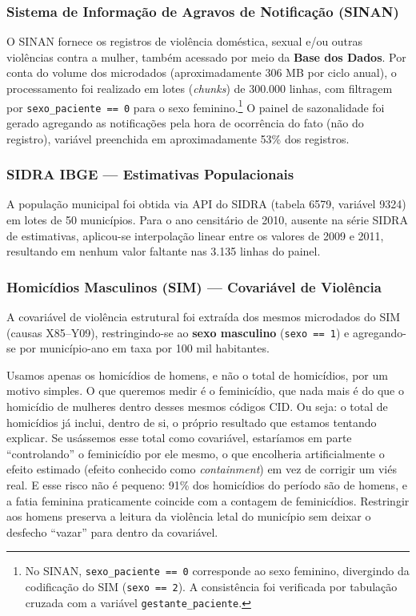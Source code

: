 \documentclass[twocolumn, 10pt]{article}
\begin{document}
\subsubsection{Sistema de Informação de Agravos de Notificação (SINAN)}
O SINAN fornece os registros de violência doméstica, sexual e/ou outras
violências contra a mulher, também acessado por meio da \textbf{Base dos Dados}.
Por conta do volume dos microdados (aproximadamente 306 MB por ciclo anual), o
processamento foi realizado em lotes (\textit{chunks}) de 300.000 linhas, com
filtragem por \texttt{sexo\_paciente == 0} para o sexo feminino.\footnote{No
SINAN, \texttt{sexo\_paciente == 0} corresponde ao sexo feminino, divergindo da
codificação do SIM (\texttt{sexo == 2}). A consistência foi verificada por
tabulação cruzada com a variável \texttt{gestante\_paciente}.}
O painel de sazonalidade foi gerado agregando as
notificações pela hora de ocorrência do fato (não do registro), variável
preenchida em aproximadamente 53\% dos registros.

\subsubsection{SIDRA IBGE — Estimativas Populacionais}
A população municipal foi obtida via API do SIDRA (tabela 6579, variável 9324)
em lotes de 50 municípios. Para o ano censitário de 2010, ausente na série SIDRA
de estimativas, aplicou-se interpolação linear entre os valores de 2009 e 2011,
resultando em nenhum valor faltante nas 3.135 linhas do painel.

\subsubsection{Homicídios Masculinos (SIM) — Covariável de Violência}
\label{sec:cov_homic}
A covariável de violência estrutural foi extraída dos mesmos microdados do SIM
(causas X85--Y09), restringindo-se ao \textbf{sexo masculino} (\texttt{sexo == 1})
e agregando-se por município-ano em taxa por 100 mil habitantes.

Usamos apenas os homicídios de homens, e não o total de homicídios, por um
motivo simples. O que queremos medir é o feminicídio, que nada mais é do que o
homicídio de mulheres dentro desses mesmos códigos CID. Ou seja: o total de
homicídios já inclui, dentro de si, o próprio resultado que estamos tentando
explicar. Se usássemos esse total como covariável, estaríamos em parte
``controlando'' o feminicídio por ele mesmo, o que encolheria artificialmente o
efeito estimado (efeito conhecido como \textit{containment}) em vez de corrigir
um viés real. E esse risco não é pequeno: 91\% dos homicídios do período são de
homens, e a fatia feminina praticamente coincide com a contagem de feminicídios.
Restringir aos homens preserva a leitura da violência letal do município sem
deixar o desfecho ``vazar'' para dentro da covariável.
\end{document}

